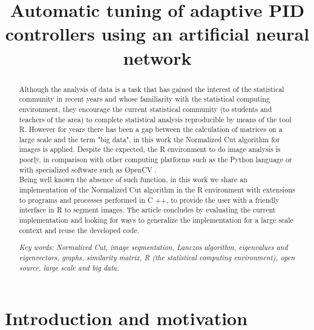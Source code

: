 \documentclass[conference]{IEEEtran}
\theoremstyle{definition}
\begin{document}
\title{Automatic tuning of adaptive PID controllers using an artificial neural network}


\author{
}



\maketitle

\begin{abstract}
Although the analysis of data is a task that has gained the interest of the statistical community in recent years and whose familiarity with the statistical computing environment, they encourage the current statistical community (to students and teachers of the area) to complete statistical analysis reproducible by means of the tool R.
However for years there has been a gap between the calculation of matrices on a large scale and the term "big data", in this work the Normalized Cut algorithm for images is applied. Despite the expected, the R environment to do image analysis is poorly, in comparison with other computing platforms such as the Python language or with specialized software such as OpenCV \cite {OpenCV}. \\
Being well known the absence of such function, in this work we share an implementation of the Normalized Cut algorithm in the R environment with extensions to programs and processes performed in C ++, to provide the user with a friendly interface in R to segment images. The article concludes by evaluating the current implementation and looking for ways to generalize the implementation for a large scale context and reuse the developed code.

\textit{Key words: Normaliced Cut, image segmentation, Lanczos algorithm, eigenvalues and eigenvectors, graphs, similarity matrix, R (the statistical computing environment), open source, large scale and big data.}\end{abstract}

\IEEEpeerreviewmaketitle


\section{Introduction and motivation}
\end{document}
